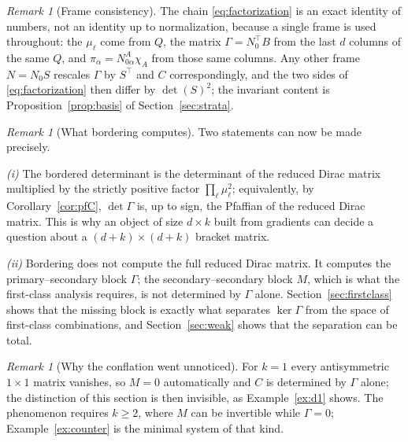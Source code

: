 \documentclass[12pt]{article}
\theoremstyle{plain}
\theoremstyle{definition}
\theoremstyle{remark}
\newtheorem{remark}[theorem]{Remark}
\begin{document}
	\begin{remark}[Frame consistency]
		\label{rem:frameconsistency}
		The chain \eqref{eq:factorization} is an exact identity of numbers, not an
		identity up to normalization, because a single frame is used throughout: the
		$\mu_{\ell}$ come from $Q$, the matrix $\Gamma=N_{0}^{\top}B$ from the last $d$
		columns of the same $Q$, and $\pi_{\alpha}=N_{0\alpha}^{A}\chi_{A}$ from those
		same columns. Any other frame $N=N_{0}S$ rescales $\Gamma$ by $S^{\top}$ and
		$C$ correspondingly, and the two sides of \eqref{eq:factorization} then differ
		by $\det(S)^{2}$; the invariant content is
		Proposition~\ref{prop:basis} of Section~\ref{sec:strata}.
	\end{remark}
	
	\begin{remark}[What bordering computes]
		\label{rem:whatbordering}
		Two statements can now be made precisely.
		
		\emph{(i)} The bordered determinant is the determinant of the reduced Dirac
		matrix multiplied by the strictly positive factor $\prod_{\ell}\mu_{\ell}^{2}$;
		equivalently, by Corollary~\ref{cor:pfC}, $\det\Gamma$ is, up to sign, the
		Pfaffian of the reduced Dirac matrix. This is why an object of size $d\times k$
		built from gradients can decide a question about a $(d+k)\times(d+k)$ bracket
		matrix.
		
		\emph{(ii)} Bordering does not compute the full reduced Dirac matrix. It
		computes the primary--secondary block $\Gamma$; the secondary--secondary block
		$M$, which is what the first-class analysis requires, is not determined by
		$\Gamma$ alone. Section~\ref{sec:firstclass} shows that the missing block is
		exactly what separates $\ker\Gamma$ from the space of first-class combinations,
		and Section~\ref{sec:weak} shows that the separation can be total.
	\end{remark}
	
	\begin{remark}[Why the conflation went unnoticed]
		\label{rem:k1}
		For $k=1$ every antisymmetric $1\times1$ matrix vanishes, so $M=0$ automatically
		and $C$ is determined by $\Gamma$ alone; the distinction of this section is then
		invisible, as Example~\ref{ex:d1} shows. The phenomenon requires $k\geq2$, where
		$M$ can be invertible while $\Gamma=0$; Example~\ref{ex:counter} is the minimal
		system of that kind.
	\end{remark}
	
\end{document}

